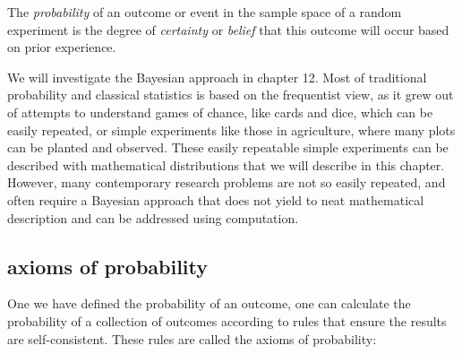 \documentclass[
  letterpaper,
  DIV=11,
  numbers=noendperiod]{scrreprt}
\begin{document}
\begin{tcolorbox}[enhanced jigsaw, coltitle=black, arc=.35mm, opacitybacktitle=0.6, breakable, bottomtitle=1mm, toptitle=1mm, titlerule=0mm, colback=white, leftrule=.75mm, rightrule=.15mm, colframe=quarto-callout-note-color-frame, colbacktitle=quarto-callout-note-color!10!white, opacityback=0, title=\textcolor{quarto-callout-note-color}{\faInfo}\hspace{0.5em}{Definition}, left=2mm, toprule=.15mm, bottomrule=.15mm]

The \emph{probability} of an outcome or event in the sample space of a
random experiment is the degree of \emph{certainty} or \emph{belief}
that this outcome will occur based on prior experience.

\end{tcolorbox}

We will investigate the Bayesian approach in chapter 12. Most of
traditional probability and classical statistics is based on the
frequentist view, as it grew out of attempts to understand games of
chance, like cards and dice, which can be easily repeated, or simple
experiments like those in agriculture, where many plots can be planted
and observed. These easily repeatable simple experiments can be
described with mathematical distributions that we will describe in this
chapter. However, many contemporary research problems are not so easily
repeated, and often require a Bayesian approach that does not yield to
neat mathematical description and can be addressed using computation.

\hypertarget{axioms-of-probability}{%
\subsection{axioms of probability}\label{axioms-of-probability}}

One we have defined the probability of an outcome, one can calculate the
probability of a collection of outcomes according to rules that ensure
the results are self-consistent. These rules are called the axioms of
probability:
\end{document}
